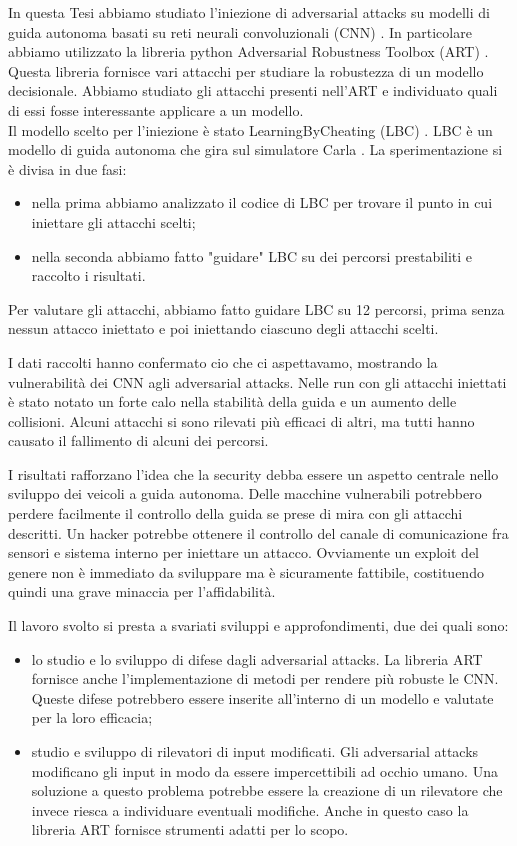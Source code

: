 In questa Tesi abbiamo studiato l'iniezione di adversarial attacks su modelli di guida autonoma basati su reti neurali convoluzionali (CNN) \cite{art2018}. 
In particolare abbiamo utilizzato la libreria python Adversarial Robustness Toolbox (ART) \cite{art2018}. Questa libreria fornisce vari attacchi per studiare la robustezza di un
modello decisionale. Abbiamo studiato gli attacchi presenti nell'ART  e individuato quali di essi fosse interessante applicare a un modello.\\

Il  modello  scelto per l'iniezione è stato LearningByCheating (LBC) \cite{lbc}. LBC è un modello di guida autonoma che gira sul simulatore 
Carla \cite{carla}. La sperimentazione si è divisa in due fasi:\begin{itemize}
    \item nella prima abbiamo analizzato il codice di LBC per trovare il punto  in cui iniettare gli attacchi scelti;
    \item nella seconda abbiamo fatto "guidare" LBC su dei percorsi prestabiliti e raccolto i risultati.
\end{itemize} 

Per valutare gli attacchi, abbiamo fatto guidare LBC su 12 percorsi, prima senza nessun attacco iniettato e poi iniettando ciascuno degli attacchi scelti.

I dati raccolti hanno confermato cio che ci aspettavamo, mostrando la vulnerabilità dei CNN agli adversarial attacks. Nelle run con gli attacchi iniettati è stato notato un forte calo nella stabilità della guida e un aumento delle collisioni.
Alcuni attacchi si sono rilevati più efficaci di altri, ma tutti hanno causato il fallimento di alcuni dei percorsi.

I risultati rafforzano l'idea che la security debba essere un aspetto centrale nello sviluppo 
dei veicoli a guida autonoma. Delle macchine vulnerabili potrebbero perdere facilmente il controllo della guida se prese di mira con gli attacchi descritti. Un hacker potrebbe ottenere il controllo
del canale di comunicazione fra sensori e sistema interno per iniettare un attacco. Ovviamente  un exploit del genere non è immediato da sviluppare ma è sicuramente fattibile, costituendo quindi una grave minaccia
per l'affidabilità.

Il lavoro svolto si presta a svariati sviluppi e approfondimenti, due  dei quali sono:\begin{itemize}
    \item lo studio e lo sviluppo di difese dagli adversarial attacks. La libreria ART fornisce anche l'implementazione di metodi per rendere più robuste le CNN.
    Queste difese potrebbero essere inserite all'interno di un modello e valutate per la loro efficacia;
    \item studio e sviluppo di rilevatori di input modificati. Gli adversarial attacks modificano gli input in modo da essere impercettibili ad occhio umano. Una 
    soluzione a questo problema potrebbe essere la creazione di un rilevatore che invece riesca a individuare eventuali modifiche. Anche in questo caso
    la libreria ART  fornisce strumenti adatti per lo scopo.
\end{itemize}